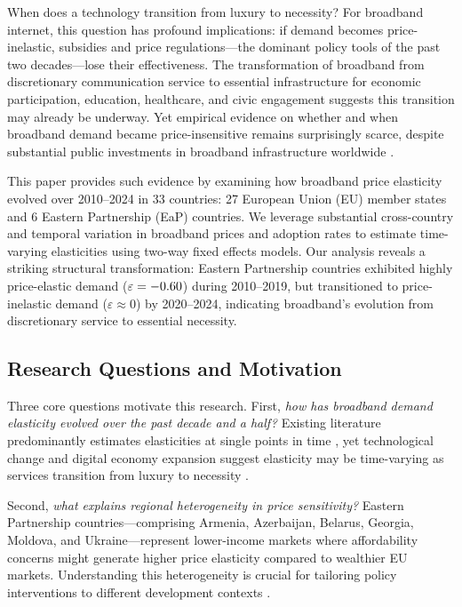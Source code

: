 When does a technology transition from luxury to necessity? For broadband internet, this question has profound implications: if demand becomes price-inelastic, subsidies and price regulations---the dominant policy tools of the past two decades---lose their effectiveness. The transformation of broadband from discretionary communication service to essential infrastructure for economic participation, education, healthcare, and civic engagement \citep{katz2010impact, bertschek2016drivers} suggests this transition may already be underway. Yet empirical evidence on whether and when broadband demand became price-insensitive remains surprisingly scarce, despite substantial public investments in broadband infrastructure worldwide \citep{oecd2020broadband}.

This paper provides such evidence by examining how broadband price elasticity evolved over 2010--2024 in 33 countries: 27 European Union (EU) member states and 6 Eastern Partnership (EaP) countries. We leverage substantial cross-country and temporal variation in broadband prices and adoption rates to estimate time-varying elasticities using two-way fixed effects models. Our analysis reveals a striking structural transformation: Eastern Partnership countries exhibited highly price-elastic demand ($\varepsilon = -0.60$) during 2010--2019, but transitioned to price-inelastic demand ($\varepsilon \approx 0$) by 2020--2024, indicating broadband's evolution from discretionary service to essential necessity.

\subsection{Research Questions and Motivation}

Three core questions motivate this research. First, \textit{how has broadband demand elasticity evolved over the past decade and a half?} Existing literature predominantly estimates elasticities at single points in time \citep{grzybowski2015fixed, madden2015demand}, yet technological change and digital economy expansion suggest elasticity may be time-varying as services transition from luxury to necessity \citep{hausman2001private}. 

Second, \textit{what explains regional heterogeneity in price sensitivity?} Eastern Partnership countries---comprising Armenia, Azerbaijan, Belarus, Georgia, Moldova, and Ukraine---represent lower-income markets where affordability concerns might generate higher price elasticity compared to wealthier EU markets. Understanding this heterogeneity is crucial for tailoring policy interventions to different development contexts \citep{waverman2001telecommunications}.

